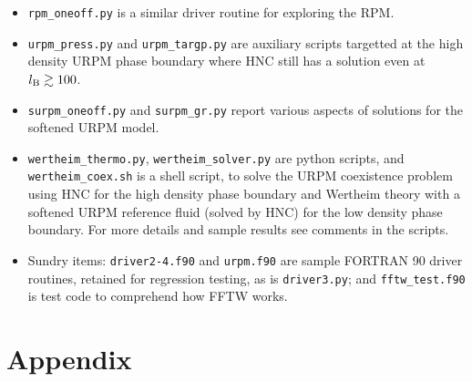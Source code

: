 \documentclass[12pt,a4paper]{article}
\begin{document}
\begin{itemize}
  (URPM) \cite{WVA+13}, including the possibility of a neutral solvent
  species.  The first routine can be used for one-off calculations of
  structure and thermodynamics at a chosen state point.  The second
  routine is intended to scan a range of densities to zero in on the
  Kirkwood transition between pure exponential and damped oscillatory
  behaviour in the tails of the total correlation functions.  Both
  routines are fully provided with command line options and sensible
  defaults, via the \verb+argparse+ module.  To see the available
  options use \verb+--help+.  The option \verb+--ncomp+ selects
  between the pure URPM case (\verb+--ncomp=2+, default) and the
  solvated URPM case (\verb+--ncomp=3+).
%
\item\verb+rpm_oneoff.py+ is a similar driver routine for exploring
  the RPM.
%
\item\verb+urpm_press.py+ and \verb+urpm_targp.py+ are auxiliary
  scripts targetted at the high density URPM phase boundary where HNC
  still has a solution even at $l_{\mathrm{B}}\gtrsim100$.
%
\item\verb+surpm_oneoff.py+ and \verb+surpm_gr.py+ report various
  aspects of solutions for the softened URPM model. 
%
\item\verb+wertheim_thermo.py+, \verb+wertheim_solver.py+ are python
  scripts, and \verb+wertheim_coex.sh+ is a shell script, to solve the
  URPM coexistence problem using HNC for the high density phase
  boundary and Wertheim theory with a softened URPM reference fluid
  (solved by HNC) for the low density phase boundary.  For more
  details and sample results see comments in the scripts.
%
\item Sundry items: \verb+driver2-4.f90+ and \verb+urpm.f90+ are
  sample FORTRAN 90 driver routines, retained for regression testing,
  as is \verb+driver3.py+; and \verb+fftw_test.f90+ is test code to
  comprehend how FFTW works.
%
\end{itemize}

\appendix
%
\section{Appendix}
%
\end{document}
